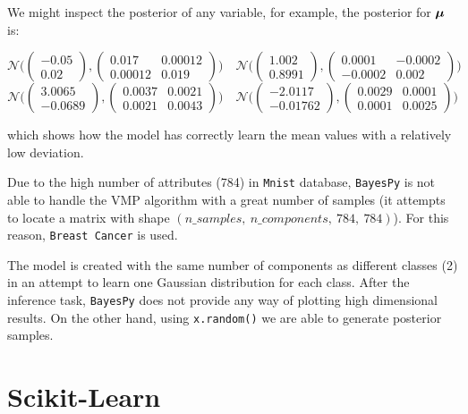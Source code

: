 We might inspect the posterior of any variable, for example, the posterior for \(\bm{\mu}\) is:

$$
\mathcal{N}\Bigg(\begin{pmatrix} -0.05 \\ 0.02 \end{pmatrix}, \begin{pmatrix} 0.017 & 0.00012 \\ 0.00012 & 0.019\end{pmatrix} \Bigg)
\quad
\mathcal{N}\Bigg(\begin{pmatrix} 1.002 \\ 0.8991 \end{pmatrix}, \begin{pmatrix} 0.0001 & -0.0002 \\ -0.0002 & 0.002 \end{pmatrix} \Bigg)
$$
$$
\mathcal{N}\Bigg(\begin{pmatrix} 3.0065 \\ -0.0689 \end{pmatrix}, \begin{pmatrix} 0.0037 & 0.0021 \\ 0.0021 & 0.0043 \end{pmatrix} \Bigg)
\quad
\mathcal{N}\Bigg(\begin{pmatrix} -2.0117 \\ -0.01762 \end{pmatrix}, \begin{pmatrix} 0.0029 & 0.0001 \\ 0.0001 & 0.0025 \end{pmatrix} \Bigg)
$$

which shows how the model has correctly learn the mean values with a relatively low deviation.

Due to the high number of attributes (784) in \texttt{Mnist} database, \texttt{BayesPy} is not able to handle the VMP algorithm with a great number of samples (it attempts to locate a matrix with shape \((n\_samples,\ n\_components,\ 784,\ 784)\)). For this reason, \texttt{Breast Cancer} is used.

The model is created with the same number of components as different classes (2) in an attempt to learn one Gaussian distribution for each class. After the inference task, \texttt{BayesPy} does not provide any way of plotting high dimensional results. On the other hand, using \texttt{x.random()} we are able to generate posterior samples.

\section{Scikit-Learn}

